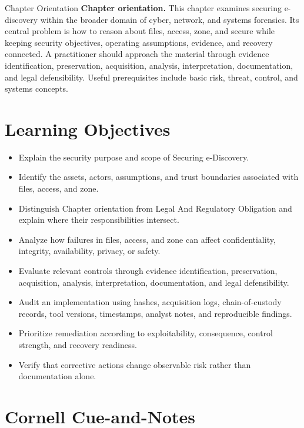 \documentclass[11pt,letterpaper]{article}
\title{\CornellDocumentTitle}
\author{}
\date{}
\begin{document}
\maketitle
\begin{CornellOverviewBox}{Chapter Orientation}
\textbf{Chapter orientation.} This chapter examines securing e-discovery within the broader domain of cyber, network, and systems forensics. Its central problem is how to reason about files, access, zone, and secure while keeping security objectives, operating assumptions, evidence, and recovery connected. A practitioner should approach the material through evidence identification, preservation, acquisition, analysis, interpretation, documentation, and legal defensibility. Useful prerequisites include basic risk, threat, control, and systems concepts.
\end{CornellOverviewBox}
\section*{Learning Objectives}
\begin{itemize}
\item Explain the security purpose and scope of Securing e-Discovery.
\item Identify the assets, actors, assumptions, and trust boundaries associated with files, access, and zone.
\item Distinguish Chapter orientation from Legal And Regulatory Obligation and explain where their responsibilities intersect.
\item Analyze how failures in files, access, and zone can affect confidentiality, integrity, availability, privacy, or safety.
\item Evaluate relevant controls through evidence identification, preservation, acquisition, analysis, interpretation, documentation, and legal defensibility.
\item Audit an implementation using hashes, acquisition logs, chain-of-custody records, tool versions, timestamps, analyst notes, and reproducible findings.
\item Prioritize remediation according to exploitability, consequence, control strength, and recovery readiness.
\item Verify that corrective actions change observable risk rather than documentation alone.
\end{itemize}
\section*{Cornell Cue-and-Notes}
\end{document}
